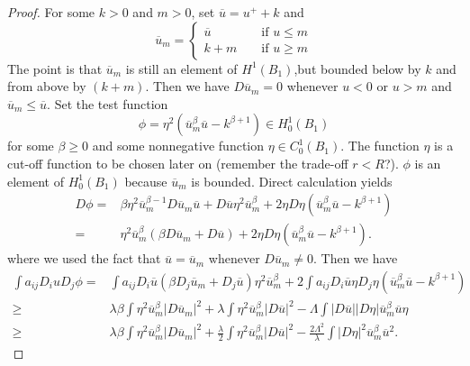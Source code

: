 \begin{proof}
For some $k>0$ and $m>0$, set $\overline{u}=u^{+}+k$ and 
\begin{equation*}
  \overline{u}_m=\left\{
    \begin{aligned}
      \overline{u}& & \text{ if }u\le m\\
      k+m & & \text{ if }u\ge m
    \end{aligned}\right.
\end{equation*}
The point is that $\overline{u}_m$ is still an element of  $H^{1}\left( B_1 \right) $,but bounded below by $k$ and from above by $\left( k+m \right) $. Then we have $D \overline{u}_m=0$ whenever $u<0$ or $u>m$ and $\overline{u}_m\le \overline{u}$.
Set the test function 
\[
  \phi=\eta^{2}\left( \overline{u}_m^{\beta}\overline{u}-k^{\beta+1} \right) \in H_0^{1}(B_1)
\] 
for some $\beta\ge 0$ and some nonnegative function $\eta \in C_0^{1}(B_1)$. The function $\eta$ is a cut-off function to be chosen later on (remember the trade-off $r<R$?). $\phi$ is an element of $H_0^{1}(B_1)$ because $\overline{u}_m$ is bounded. Direct calculation yields
\begin{align*}
  D \phi = & \beta \eta^2\overline{u}_m^{\beta-1}D \overline{u}_m \overline{u}+D \overline{u}\eta^2\overline{u}_m^{\beta}+2\eta D\eta\left( \overline{u}_m^{\beta}\overline{u}-k^{\beta+1} \right)\\
  =& \eta^2\overline{u}_m^{\beta}\left( \beta D\overline{u}_m+D\overline{u} \right) +2\eta D \eta\left( \overline{u}_m^{\beta}\overline{u}-k^{\beta+1} \right) 
.\end{align*}
where we used the fact that $\overline{u}=\overline{u}_m$ whenever $D \overline{u}_m\neq 0$.
Then we have 
\begin{align*}
  \int a_{ij}D_iuD_j\phi=&\int a_{ij}D_i \overline{u}\left( \beta D_j\overline{u}_m+D_j\overline{u} \right) \eta^{2}\overline{u}_m^{\beta}+2\int a_{ij}D_i\overline{u}\eta D_j\eta\left( \overline{u}_m^{\beta}\overline{u}-k^{\beta+1} \right)\\
  \ge &\lambda\beta \int\eta^{2}\overline{u}^{\beta}_m\left| D\overline{u}_m \right|^{2}+\lambda\int\eta^2\overline{u}_m^{\beta}\left| D\overline{u} \right| ^2-\Lambda\int\left| D\overline{u} \right| \left| D\eta \right| \overline{u}_m^{\beta}\overline{u}\eta\\
  \ge & \lambda\beta \int\eta^2\overline{u}_m^{\beta}\left| D\overline{u}_m \right| ^2+\frac{\lambda}{2}\int\eta^2\overline{u}_m^{\beta}\left| D\overline{u} \right| ^2-\frac{2\Lambda^2}{\lambda}\int \left| D\eta \right| ^2\overline{u}_m^{\beta}\overline{u}^2
.\end{align*}

\end{proof}
